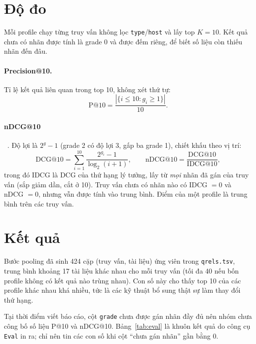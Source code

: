 \documentclass[12pt,a4paper]{report}
\begin{document}
\section{Độ đo}

Mỗi profile chạy từng truy vấn không lọc \texttt{type}/\texttt{host} và lấy top $K = 10$. Kết quả chưa có nhãn được tính
là grade 0 và được đếm riêng, để biết số liệu còn thiếu nhãn đến đâu.

\paragraph{Precision@10.} Tỉ lệ kết quả liên quan trong top 10, không xét thứ tự:
\begin{equation}
\mathrm{P@10} = \frac{|\{i \le 10 : g_i \ge 1\}|}{10}.
\end{equation}

\paragraph{nDCG@10}~\cite{jarvelin2002}. Độ lợi là $2^{g} - 1$ (grade 2 có độ lợi 3, gấp ba grade 1), chiết khấu theo vị
trí:
\begin{equation}
\mathrm{DCG@10} = \sum_{i=1}^{10} \frac{2^{g_i} - 1}{\log_2(i + 1)}, \qquad
\mathrm{nDCG@10} = \frac{\mathrm{DCG@10}}{\mathrm{IDCG@10}},
\end{equation}
trong đó IDCG là DCG của thứ hạng lý tưởng, lấy từ \emph{mọi} nhãn đã gán của truy vấn (sắp giảm dần, cắt ở 10). Truy
vấn chưa có nhãn nào có IDCG $= 0$ và nDCG $= 0$, nhưng vẫn được tính vào trung bình. Điểm của một profile là trung bình
trên các truy vấn.

\section{Kết quả}

Bước pooling đã sinh 424 cặp (truy vấn, tài liệu) ứng viên trong \texttt{qrels.tsv}, trung bình khoảng 17 tài liệu khác
nhau cho mỗi truy vấn (tối đa 40 nếu bốn profile không có kết quả nào trùng nhau). Con số này cho thấy top 10 của các
profile khác nhau khá nhiều, tức là các kỹ thuật bổ sung thật sự làm thay đổi thứ hạng.

Tại thời điểm viết báo cáo, cột \texttt{grade} chưa được gán nhãn đầy đủ nên nhóm chưa công bố số liệu P@10 và nDCG@10.
Bảng~\ref{tab:eval} là khuôn kết quả do công cụ \texttt{Eval} in ra; chỉ nên tin các con số khi cột ``chưa gán nhãn''
gần bằng 0.
\end{document}
